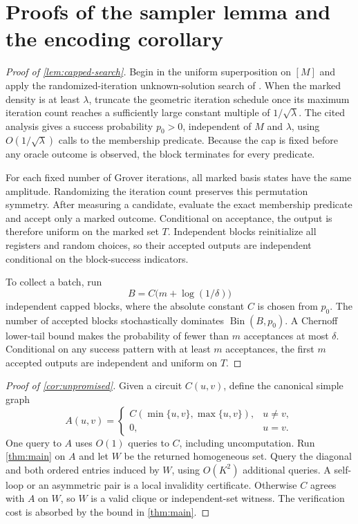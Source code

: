 \section{Proofs of the sampler lemma and the encoding corollary}\label{app:capped-search}

\begin{proof}[Proof of \cref{lem:capped-search}]
Begin in the uniform superposition on $[M]$ and apply the randomized-iteration
unknown-solution search of \cite{BBHT1998}.  When the marked density is at
least $\lambda$, truncate the geometric iteration schedule once its maximum
iteration count reaches a sufficiently large constant multiple of
$1/\sqrt\lambda$.  The cited analysis gives a success probability $p_0>0$,
independent of $M$ and $\lambda$, using $O(1/\sqrt\lambda)$ calls to the
membership predicate.  Because the cap is fixed before any oracle outcome is
observed, the block terminates for every predicate.

For each fixed number of Grover iterations, all marked basis states have the
same amplitude.  Randomizing the iteration count preserves this permutation
symmetry.  After measuring a candidate, evaluate the exact membership
predicate and accept only a marked outcome.  Conditional on acceptance, the
output is therefore uniform on the marked set $T$.  Independent blocks
reinitialize all registers and random choices, so their accepted outputs are
independent conditional on the block-success indicators.

To collect a batch, run
\[
 B=C\bigl(m+\log(1/\delta)\bigr)
\]
independent capped blocks, where the absolute constant $C$ is chosen from
$p_0$.  The number of accepted blocks stochastically dominates
$\operatorname{Bin}(B,p_0)$.  A Chernoff lower-tail bound
\cite{Chernoff1952} makes the probability of fewer than $m$ acceptances at
most $\delta$.  Conditional on any success pattern with at least $m$
acceptances, the first $m$ accepted outputs are independent and uniform on
$T$.
\end{proof}

\begin{proof}[Proof of \cref{cor:unpromised}]
Given a circuit $C(u,v)$, define the canonical simple graph
\[
 A(u,v)=
 \begin{cases}
 C(\min\{u,v\},\max\{u,v\}),&u\ne v,\\
 0,&u=v.
 \end{cases}
\]
One query to $A$ uses $O(1)$ queries to $C$, including uncomputation.  Run
\cref{thm:main} on $A$ and let $W$ be the returned homogeneous set.  Query the
diagonal and both ordered entries induced by $W$, using $O(K^2)$ additional
queries.  A self-loop or an asymmetric pair is a local invalidity certificate.
Otherwise $C$ agrees with $A$ on $W$, so $W$ is a valid clique or
independent-set witness.  The verification cost is absorbed by the bound in
\cref{thm:main}.
\end{proof}
